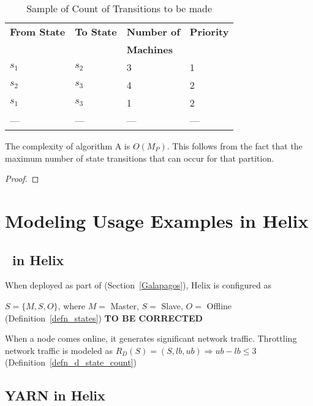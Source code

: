 \begin{table}
\centering
\begin{tabular}{|l|l|l|l|} \hline \hline
{\bf From State} & {\bf To State} & {\bf Number of} & {\bf Priority} \\ 
                 &                & {\bf Machines} &                \\ \hline \hline
\(s_1\) & \(s_2\) & 3 & 1 \\ \hline 
\(s_2\) & \(s_3\) & 4 & 2 \\ \hline 
\(s_1\) & \(s_3\) & 1 & 2 \\ \hline 
--- & --- & --- & --- \\ \hline 
\hline
\end{tabular}
\caption{Sample of Count of Transitions to be made}
\label{State_Transition_Count}
\end{table}
\begin{theorem}
The complexity of algorithm A is \(O(M_P)\). This follows from the fact 
that the maximum number of state transitions that can occur for that
partition.
\end{theorem}

\begin{proof}
\TBC
\end{proof}

\section{Modeling Usage Examples in Helix}

\subsection{\GP\ in Helix}
\label{Galapagos_in_Helix}
When deployed as part of \GP (Section~\ref{Galapagos}), Helix is
configured as 
\be
\item \(S = \{M, S, O\}\), where \(M =\) Master, \(S =\) Slave, \(O =\)
Offline (Definition~\ref{defn_states}) {\bf TO BE CORRECTED}
\item When a node comes online, it generates significant network
traffic. Throttling network traffic is modeled as \(R_D(S) = (S, lb, ub)
\Rightarrow ub - lb \leq 3\) (Definition~\ref{defn_d_state_count})
\item \TBC
\ee

\subsection{YARN in Helix}
\label{YARN_in_Helix}

